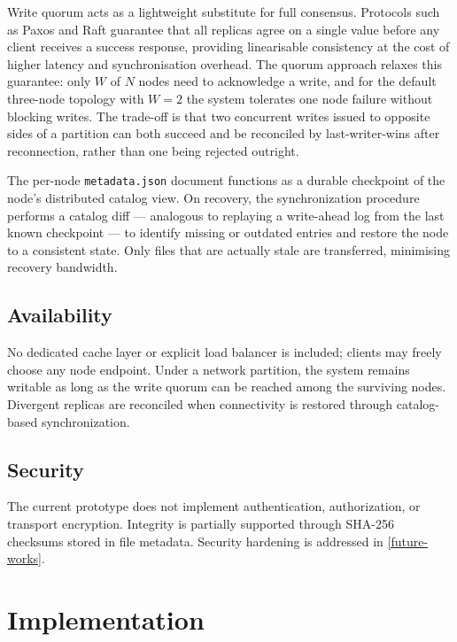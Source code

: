 \documentclass{scrartcl}
\begin{document}
Write quorum acts as a lightweight substitute for full consensus. Protocols such as Paxos and Raft guarantee that all replicas agree on a single value before any client receives a success response, providing linearisable consistency at the cost of higher latency and synchronisation overhead. The quorum approach relaxes this guarantee: only $W$ of $N$ nodes need to acknowledge a write, and for the default three-node topology with $W = 2$ the system tolerates one node failure without blocking writes. The trade-off is that two concurrent writes issued to opposite sides of a partition can both succeed and be reconciled by last-writer-wins after reconnection, rather than one being rejected outright.

The per-node \texttt{metadata.json} document functions as a durable checkpoint of the node's distributed catalog view. On recovery, the synchronization procedure performs a catalog diff --- analogous to replaying a write-ahead log from the last known checkpoint --- to identify missing or outdated entries and restore the node to a consistent state. Only files that are actually stale are transferred, minimising recovery bandwidth.

\subsection{Availability}\label{availability}

No dedicated cache layer or explicit load balancer is included; clients may freely choose any node endpoint. Under a network partition, the system remains writable as long as the write quorum can be reached among the surviving nodes. Divergent replicas are reconciled when connectivity is restored through catalog-based synchronization.

\subsection{Security}\label{security}

The current prototype does not implement authentication, authorization, or transport encryption. Integrity is partially supported through SHA-256 checksums stored in file metadata. Security hardening is addressed in \cref{future-works}.

\section{Implementation}\label{implementation}
\end{document}
